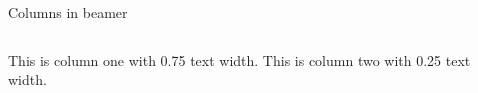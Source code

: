 
\begin{frame}{Columns in beamer}
    \begin{columns}
        \centering
        This is column one with 0.75 text width.
        \centering
        This is column two with 0.25 text width.
    \end{columns}
\end{frame}
